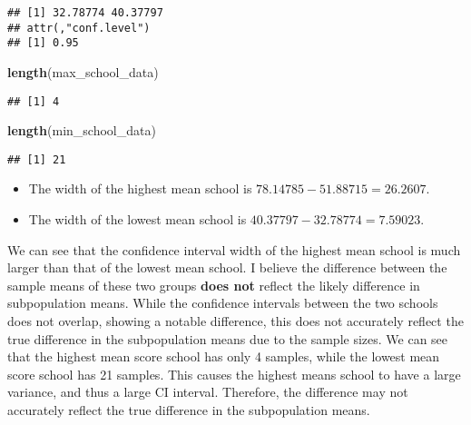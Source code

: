 \documentclass[
]{article}
\newenvironment{Shaded}{\begin{snugshade}}{\end{snugshade}}
\newcommand{\FunctionTok}[1]{\textcolor[rgb]{0.13,0.29,0.53}{\textbf{#1}}}
\newcommand{\NormalTok}[1]{#1}
\newcommand{\SpecialCharTok}[1]{\textcolor[rgb]{0.81,0.36,0.00}{\textbf{#1}}}
\providecommand{\tightlist}{%
  \setlength{\itemsep}{0pt}\setlength{\parskip}{0pt}}
\begin{document}
\begin{Shaded}
\end{Shaded}

\begin{verbatim}
## [1] 32.78774 40.37797
## attr(,"conf.level")
## [1] 0.95
\end{verbatim}

\begin{Shaded}
\begin{Highlighting}[]
\FunctionTok{length}\NormalTok{(max\_school\_data)}
\end{Highlighting}
\end{Shaded}

\begin{verbatim}
## [1] 4
\end{verbatim}

\begin{Shaded}
\begin{Highlighting}[]
\FunctionTok{length}\NormalTok{(min\_school\_data)}
\end{Highlighting}
\end{Shaded}

\begin{verbatim}
## [1] 21
\end{verbatim}

\begin{itemize}
\tightlist
\item
  The width of the highest mean school is
  \(78.14785−51.88715 = 26.2607\).
\item
  The width of the lowest mean school is
  \(40.37797 − 32.78774 = 7.59023\).
\end{itemize}

We can see that the confidence interval width of the highest mean school
is much larger than that of the lowest mean school. I believe the
difference between the sample means of these two groups \textbf{does
not} reflect the likely difference in subpopulation means. While the
confidence intervals between the two schools does not overlap, showing a
notable difference, this does not accurately reflect the true difference
in the subpopulation means due to the sample sizes. We can see that the
highest mean score school has only 4 samples, while the lowest mean
score school has 21 samples. This causes the highest means school to
have a large variance, and thus a large CI interval. Therefore, the
difference may not accurately reflect the true difference in the
subpopulation means.
\end{document}
